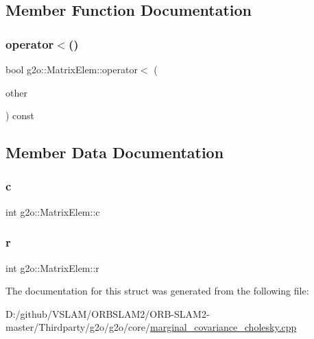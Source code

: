 \subsection{Member Function Documentation}
\mbox{\label{structg2o_1_1_matrix_elem_ae66d518ebb04f9ba74a9d2195020ff63}} 
\subsubsection{\texorpdfstring{operator$<$()}{operator<()}}
{\footnotesize\ttfamily bool g2o\+::\+Matrix\+Elem\+::operator$<$ (\begin{DoxyParamCaption}\item[{const \mbox{\hyperlink{structg2o_1_1_matrix_elem}{Matrix\+Elem}} \&}]{other }\end{DoxyParamCaption}) const\hspace{0.3cm}{\ttfamily [inline]}}



\subsection{Member Data Documentation}
\mbox{\label{structg2o_1_1_matrix_elem_a32574586352669720ba955c1b8cafbc4}} 
\subsubsection{\texorpdfstring{c}{c}}
{\footnotesize\ttfamily int g2o\+::\+Matrix\+Elem\+::c}

\mbox{\label{structg2o_1_1_matrix_elem_a5943163fa13505b2d2d9204f3fe61629}} 
\subsubsection{\texorpdfstring{r}{r}}
{\footnotesize\ttfamily int g2o\+::\+Matrix\+Elem\+::r}



The documentation for this struct was generated from the following file\+:\begin{DoxyCompactItemize}
\item 
D\+:/github/\+V\+S\+L\+A\+M/\+O\+R\+B\+S\+L\+A\+M2/\+O\+R\+B-\/\+S\+L\+A\+M2-\/master/\+Thirdparty/g2o/g2o/core/\mbox{\hyperlink{marginal__covariance__cholesky_8cpp}{marginal\+\_\+covariance\+\_\+cholesky.\+cpp}}\end{DoxyCompactItemize}
